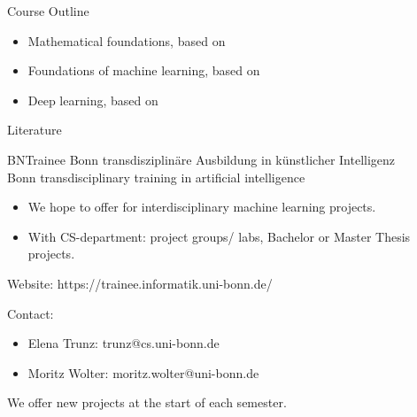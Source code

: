 \documentclass{beamer}
\begin{document}
    \begin{frame}{Course Outline}
      \begin{itemize}
        \item Mathematical foundations, based on \cite{deisenroth_faisal_ong_2020}
        \item Foundations of machine learning, based on \cite{deisenroth_faisal_ong_2020}
        \item Deep learning, based on \cite{Goodfellow_et_al_2016}
      \end{itemize}
    \end{frame}

    \begin{frame}{Literature}
      \printbibliography
    \end{frame}


    \begin{frame}{BNTrainee}
      Bonn transdisziplinäre Ausbildung in künstlicher Intelligenz \\
      Bonn transdisciplinary training in artificial intelligence
      \begin{itemize}
        \item We hope to offer for interdisciplinary machine learning projects.
        \item With CS-department: project groups/ labs, Bachelor or Master Thesis projects.
      \end{itemize}
      Website: https://trainee.informatik.uni-bonn.de/
      
      Contact:
      \begin{itemize}
        \item Elena Trunz: trunz@cs.uni-bonn.de
        \item Moritz Wolter: moritz.wolter@uni-bonn.de
      \end{itemize}
      We offer new projects at the start of each semester.
    \end{frame}
\end{document}
